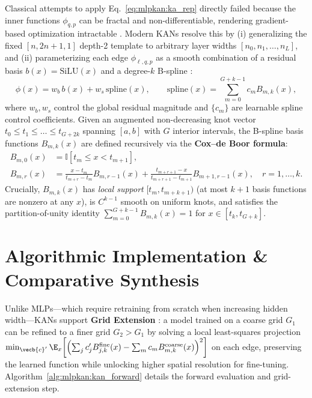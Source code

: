 \documentclass[../../../../master.tex]{subfiles}
\begin{document}
Classical attempts to apply Eq.~\eqref{eq:mlpkan:ka_rep} directly failed because the inner functions $\phi_{q,p}$ can be fractal and non-differentiable, rendering gradient-based optimization intractable . Modern KANs resolve this by (i) generalizing the fixed $[n, 2n+1, 1]$ depth-2 template to arbitrary layer widths $[n_0, n_1, \dots, n_L]$, and (ii) parameterizing each edge $\phi_{\ell,q,p}$ as a smooth combination of a residual basis $b(x) = \mathrm{SiLU}(x)$ and a degree-$k$ B-spline :
\begin{equation}
  \label{eq:mlpkan:kan_edge}
  \phi(x) = w_b \, b(x) + w_s \, \mathrm{spline}(x), \qquad
  \mathrm{spline}(x) = \sum_{m=0}^{G+k-1} c_m B_{m,k}(x),
\end{equation}
where $w_b, w_s$ control the global residual magnitude and $\{c_m\}$ are learnable spline control coefficients. Given an augmented non-decreasing knot vector $t_0 \le t_1 \le \dots \le t_{G+2k}$ spanning $[a, b]$ with $G$ interior intervals, the B-spline basis functions $B_{m,k}(x)$ are defined recursively via the \textbf{Cox--de Boor formula}:
\begin{align}
  B_{m,0}(x) &= \mathbb{I}[t_m \le x < t_{m+1}], \label{eq:mlpkan:cdb0} \\
  B_{m,r}(x) &= \frac{x - t_m}{t_{m+r} - t_m} B_{m,r-1}(x) + \frac{t_{m+r+1} - x}{t_{m+r+1} - t_{m+1}} B_{m+1,r-1}(x), \quad r = 1, \dots, k. \label{eq:mlpkan:cdbr}
\end{align}
Crucially, $B_{m,k}(x)$ has \emph{local support} $[t_m, t_{m+k+1})$ (at most $k+1$ basis functions are nonzero at any $x$), is $C^{k-1}$ smooth on uniform knots, and satisfies the partition-of-unity identity $\sum_{m=0}^{G+k-1} B_{m,k}(x) = 1$ for $x \in [t_k, t_{G+k}]$.

\section{Algorithmic Implementation \& Comparative Synthesis}
\label{sec:mlpkan:algo}

Unlike MLPs---which require retraining from scratch when increasing hidden width---KANs support \textbf{Grid Extension} : a model trained on a coarse grid $G_1$ can be refined to a finer grid $G_2 > G_1$ by solving a local least-squares projection $\min_{\vecb{c}'} \E_{x}\!\left[\left(\sum_j c'_j B_{j,k}^{\text{fine}}(x) - \sum_m c_m B_{m,k}^{\text{coarse}}(x)\right)^2\right]$ on each edge, preserving the learned function while unlocking higher spatial resolution for fine-tuning. Algorithm~\ref{alg:mlpkan:kan_forward} details the forward evaluation and grid-extension step.
\end{document}
